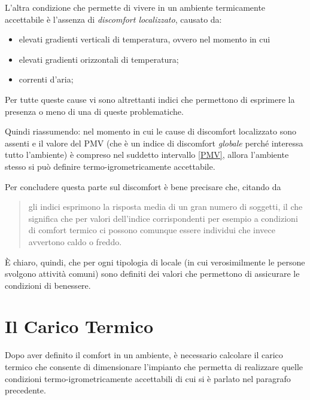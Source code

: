 L'altra condizione che permette di vivere in un ambiente termicamente accettabile è l'assenza di \emph{discomfort localizzato}, causato da:
\begin{itemize}
	\item elevati gradienti verticali di temperatura, ovvero nel momento in cui 
	\item elevati gradienti orizzontali di temperatura;
	\item correnti d'aria;
\end{itemize}
Per tutte queste cause vi sono altrettanti indici che permettono di esprimere la presenza o meno di una di queste problematiche.

Quindi riassumendo: nel momento in cui le cause di discomfort localizzato sono assenti e il valore del PMV (che è un indice di discomfort \emph{globale} perché interessa tutto l'ambiente) è compreso nel suddetto intervallo \ref{PMV}, allora l'ambiente stesso si può definire termo-igrometricamente accettabile. 

Per concludere questa parte sul discomfort è bene precisare che, citando da \cite[pag 31]{alfano}
\begin{quote}
	gli indici esprimono la risposta media di un gran numero di soggetti, il che significa che per valori dell'indice corrispondenti per esempio a condizioni di comfort termico ci possono comunque essere individui che invece avvertono caldo o freddo.
\end{quote} 
È chiaro, quindi, che per ogni tipologia di locale (in cui verosimilmente le persone svolgono attività comuni) sono definiti dei valori che permettono di assicurare le condizioni di benessere.
\section{Il Carico Termico}
Dopo aver definito il comfort in un ambiente, è necessario calcolare il carico termico che consente di dimensionare l'impianto che permetta di realizzare quelle condizioni termo-igrometricamente accettabili di cui si è parlato nel paragrafo precedente.

